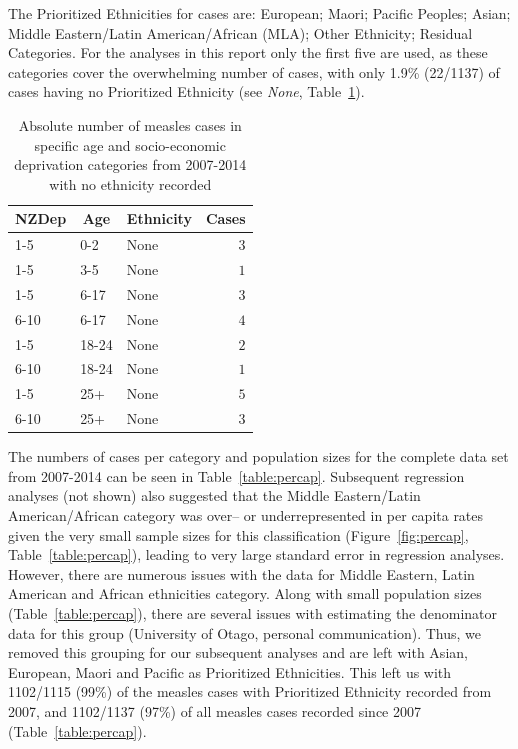 \documentclass{article}
\begin{document}
\begin{itemize}
The Prioritized Ethnicities for cases are:  European; Maori; Pacific Peoples; Asian; Middle Eastern/Latin American/African (MLA); Other Ethnicity; Residual Categories. For the analyses in this report only the first five are used, as these categories cover the overwhelming number of cases, with only 1.9\% (22/1137) of cases having no Prioritized Ethnicity (see \emph{None}, Table~\ref{table:none}). 

\begin{table}[hbtp]
\footnotesize
\begin{center}
\begin{tabular}{lllr}
\hline\hline
\multicolumn{1}{c}{NZDep}&\multicolumn{1}{c}{Age}&\multicolumn{1}{c}{Ethnicity}&\multicolumn{1}{c}{Cases}\tabularnewline
\hline
1-5&0-2&None&$3$\tabularnewline
1-5&3-5&None&$1$\tabularnewline
1-5&6-17&None&$3$\tabularnewline
6-10&6-17&None&$4$\tabularnewline
1-5&18-24&None&$2$\tabularnewline
6-10&18-24&None&$1$\tabularnewline
1-5&25+&None&$5$\tabularnewline
6-10&25+&None&$3$\tabularnewline
\hline
\end{tabular}\end{center}\caption{Absolute number of measles cases in specific age and socio-economic deprivation categories from 2007-2014 with no ethnicity recorded}
\label{table:none}
\end{table}


The numbers of cases per category and population sizes for the complete data set from 2007-2014 can be seen in Table~\ref{table:percap}. Subsequent regression analyses (not shown) also suggested that the Middle Eastern/Latin American/African category was over-- or underrepresented in per capita rates given the very small sample sizes for this classification (Figure~\ref{fig:percap}, Table~\ref{table:percap}), leading to very large standard error in regression analyses. However, there are numerous issues with the data for Middle Eastern, Latin American and African ethnicities category. Along with small population sizes (Table~\ref{table:percap}), there are several issues with estimating the denominator data for this group (University of Otago, personal communication). Thus, we removed this grouping for our subsequent analyses and are left with Asian, European, Maori and Pacific as Prioritized Ethnicities. This left us with 1102/1115 (99\%) of the measles cases with Prioritized Ethnicity recorded from 2007, and 1102/1137 (97\%) of all measles cases recorded since 2007 (Table~\ref{table:percap}).


\end{itemize}
\end{document}
